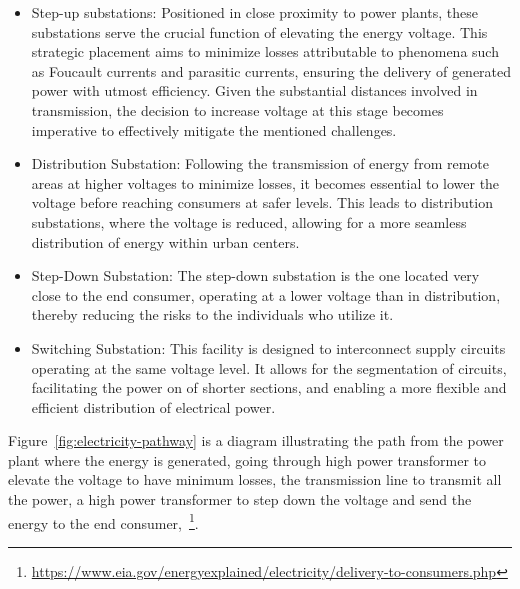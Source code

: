 \begin{itemize}
	\item Step-up substations: Positioned in close proximity to power plants, these substations serve the crucial function of elevating the energy voltage. This strategic placement aims to minimize losses attributable to phenomena such as Foucault currents and parasitic currents, ensuring the delivery of generated power with utmost efficiency. Given the substantial distances involved in transmission, the decision to increase voltage at this stage becomes imperative to effectively mitigate the mentioned challenges.
	
	\item Distribution Substation: Following the transmission of energy from remote areas at higher voltages to minimize losses, it becomes essential to lower the voltage before reaching consumers at safer levels. This leads to distribution substations, where the voltage is reduced, allowing for a more seamless distribution of energy within urban centers.
	
	\item Step-Down Substation: The step-down substation is the one located very close to the end consumer, operating at a lower voltage than in distribution, thereby reducing the risks to the individuals who utilize it.
	
	\item Switching Substation: This facility is designed to interconnect supply circuits operating at the same voltage level. It allows for the segmentation of circuits, facilitating the power on of shorter sections, and enabling a more flexible and efficient distribution of electrical power.
	
\end{itemize}

Figure~\ref{fig:electricity-pathway} is a diagram illustrating the path from the power plant where the energy is generated, going through high power transformer to elevate the voltage to have minimum losses, the transmission line to transmit all the power, a high power transformer to step down the voltage and send the energy to the end consumer,~\footnote{\url{https://www.eia.gov/energyexplained/electricity/delivery-to-consumers.php}}.


